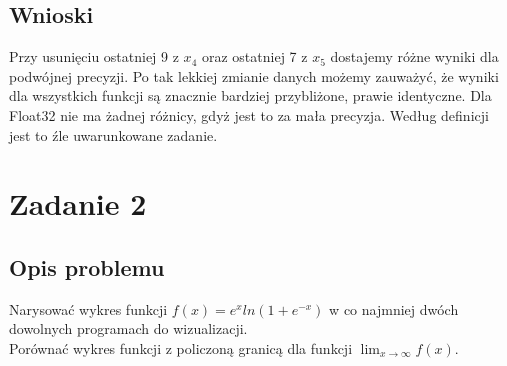 \documentclass{article}
\begin{document}
\subsection*{Wnioski}
	Przy usunięciu ostatniej 9 z $x_4$ oraz ostatniej 7 z $x_5$ dostajemy różne wyniki dla podwójnej precyzji.
	Po tak lekkiej zmianie danych możemy zauważyć, że wyniki dla wszystkich funkcji są znacznie bardziej przybliżone, prawie identyczne.
	Dla Float32 nie ma żadnej różnicy, gdyż jest to za mała precyzja. Według definicji jest to źle uwarunkowane zadanie.

\section*{Zadanie 2}
\subsection*{Opis problemu}
	Narysować wykres funkcji $f(x) = e^xln(1 + e^{-x})$ w co najmniej dwóch dowolnych programach do wizualizacji. \\
	Porównać wykres funkcji z policzoną granicą dla funkcji $\lim_{x\to\infty}f(x)$.
\end{document}
